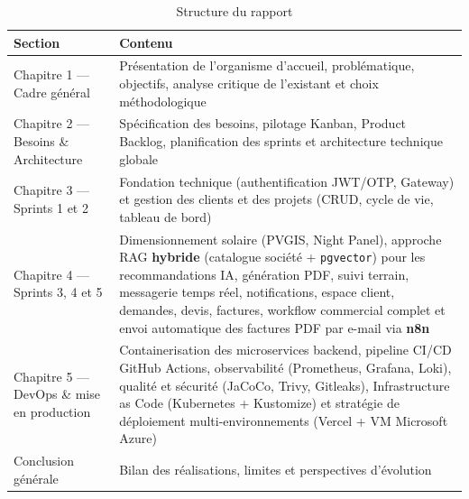 \begin{table}[H]
  \caption*{Structure du rapport}
  \centering\small
  \setlength{\tabcolsep}{8pt}
  \begin{tabularx}{\textwidth}{L{4.5cm} X}
    \toprule
    \textbf{Section} & \textbf{Contenu} \\
    \midrule
    Chapitre 1 --- Cadre général &
    Présentation de l'organisme d'accueil, problématique, objectifs,
    analyse critique de l'existant et choix méthodologique \\
    \addlinespace
    Chapitre 2 --- Besoins \& Architecture &
    Spécification des besoins, pilotage Kanban, Product Backlog,
    planification des sprints et architecture technique globale \\
    \addlinespace
    Chapitre 3 --- Sprints 1 et 2 &
    Fondation technique (authentification JWT/OTP, Gateway) et gestion
    des clients et des projets (CRUD, cycle de vie, tableau de bord) \\
    \addlinespace
    Chapitre 4 --- Sprints 3, 4 et 5 &
    Dimensionnement solaire (PVGIS, Night Panel), approche RAG \textbf{hybride}
    (catalogue société + \texttt{pgvector}) pour les recommandations IA,
    génération PDF, suivi terrain, messagerie
    temps réel, notifications, espace client, demandes, devis,
    factures, workflow commercial complet et envoi automatique des factures
    PDF par e-mail via \textbf{n8n} \\
    \addlinespace
    Chapitre 5 --- DevOps \& mise en production &
    Containerisation des microservices backend, pipeline CI/CD GitHub
    Actions, observabilité (Prometheus, Grafana, Loki), qualité et
    sécurité (JaCoCo, Trivy, Gitleaks), Infrastructure as Code
    (Kubernetes + Kustomize) et stratégie de déploiement
    multi-environnements (Vercel + VM Microsoft Azure) \\
    \addlinespace[8pt]
    Conclusion générale &
    Bilan des réalisations, limites et perspectives d'évolution \\
    \bottomrule
  \end{tabularx}
\end{table}

\cleardoublepage
